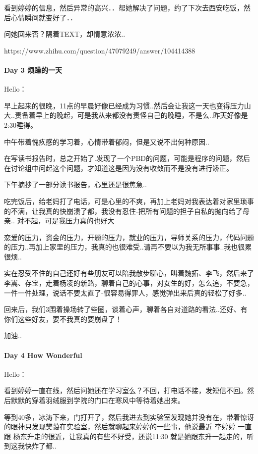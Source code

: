 \documentclass[UTF8,a4paper,8pt]{ctexbook}
\begin{document}
	 	 看到婷婷的信息，然后异常的高兴．．帮她解决了问题，约了下次去西安吃饭，然后心情瞬间就变好了．．
	 	 
	 	 问她回来否？隔着TEXT，却情意浓浓..
	 	 
	 	 https://www.zhihu.com/question/47079249/answer/104414388
	 	 
	 \paragraph{Day 3  烦躁的一天   \quad     }
		 Hello：
		 
		 早上起来的很晚，11点的早晨好像已经成为习惯..然后会让我这一天也变得压力山大..责备着早上的晚起，可是我从来都没有责怪自己的晚睡，不是么..昨天好像是2:30睡得。
		 
		 中午带着愧疚感的学习着，心情带着郁闷，但是又说不出何种原因..
		 
		 在写读书报告时，总之开始了.发现了一个PBD的问题，可能是程序的问题，然后在讨论组中问起这个问题，才知道这是因为没有收敛而不是没有进行矫正。
		 
		 下午摘抄了一部分读书报告，心里还是很焦急..
		 
		 吃完饭后，给老妈打了电话，可是心里的不爽，再加上老妈对我表达着对家里琐事的不满，让我真的快崩溃了都，我没有忍住-把所有问题的担子自私的抛向给了母亲.. 对不起，可是我压力真的也好大
		 
		 恋爱的压力，资金的压力，开题的压力，就业的压力，导师关系的压力，代码问题的压力..再加上家里的压力，我真的也很难受..请再不要以为我无所事事..我也很累很烦..
		 
		 实在忍受不住的自己还好有些朋友可以陪我散步聊心，叫着魏拓、李飞，然后来了李嵩、存宝，走着杨凌的新路，聊着自己的心事，对女生的好，怎么追，不要急，一件一件处理，说话不要太直了-很容易得罪人，感觉弹出来后真的轻松了好多..
	 
		 回来后，我们3围着操场转了些圈，谈着心声，聊着各自对道路的看法..还好、有你们这些好友，要不我真的要崩盘了！
		 
		 加油..
 	 \paragraph{Day 4   How Wonderful    \quad     }
	 	 Hello： 
	 	 
	 	 看到婷婷一直在线，然后问她还在学习室么？不回，打电话不接，发短信不回。然后默默的穿着羽绒服到学院的门口在寒风中等待着她出来。
	 	 
	 	 等到40多，冰涛下来，门打开了，然后我进去到实验室发现她并没有在，带着惊讶的眼神只发现樊蔼在实验室，然后就聊起来婷婷的一些事，他说最近 李婷婷 一直跟 杨东升走的很近，让我真的有些不好受，还说11:30 就是她跟东升一起走的，听到这我快炸了都..
	 	 
\end{document}
